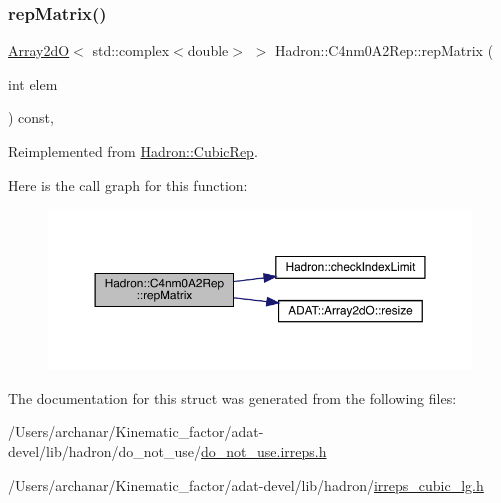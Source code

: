 \subsubsection{\texorpdfstring{repMatrix()}{repMatrix()}\hspace{0.1cm}{\footnotesize\ttfamily [3/3]}}
{\footnotesize\ttfamily \mbox{\hyperlink{classADAT_1_1Array2dO}{Array2dO}}$<$ std\+::complex$<$double$>$ $>$ Hadron\+::\+C4nm0\+A2\+Rep\+::rep\+Matrix (\begin{DoxyParamCaption}\item[{int}]{elem }\end{DoxyParamCaption}) const\hspace{0.3cm}{\ttfamily [inline]}, {\ttfamily [virtual]}}



Reimplemented from \mbox{\hyperlink{structHadron_1_1CubicRep_ac5d7e9e6f4ab1158b5fce3e4ad9e8005}{Hadron\+::\+Cubic\+Rep}}.

Here is the call graph for this function\+:
\nopagebreak
\begin{figure}[H]
\begin{center}
\leavevmode
\includegraphics[width=350pt]{d2/db9/structHadron_1_1C4nm0A2Rep_aac52fe57a274d94bbaef9c6b2699e1c9_cgraph}
\end{center}
\end{figure}


The documentation for this struct was generated from the following files\+:\begin{DoxyCompactItemize}
\item 
/\+Users/archanar/\+Kinematic\+\_\+factor/adat-\/devel/lib/hadron/do\+\_\+not\+\_\+use/\mbox{\hyperlink{adat-devel_2lib_2hadron_2do__not__use_2do__not__use_8irreps_8h}{do\+\_\+not\+\_\+use.\+irreps.\+h}}\item 
/\+Users/archanar/\+Kinematic\+\_\+factor/adat-\/devel/lib/hadron/\mbox{\hyperlink{adat-devel_2lib_2hadron_2irreps__cubic__lg_8h}{irreps\+\_\+cubic\+\_\+lg.\+h}}\end{DoxyCompactItemize}
